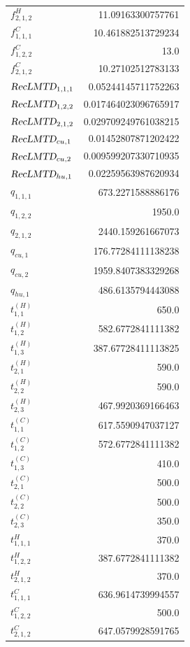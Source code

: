 \documentclass{article}%
\begin{document}
\begin{multicols*}{3}
\begin{supertabular}{lr}
	$f_{2,1,2}^{H}$ & 11.09163300757761 \\%
	$f_{1,1,1}^{C}$ & 10.461882513729234 \\%
	$f_{1,2,2}^{C}$ & 13.0 \\%
	$f_{2,1,2}^{C}$ & 10.27102512783133 \\%
	$\textsl{RecLMTD}_{1,1,1}$ & 0.05244145711752263 \\%
	$\textsl{RecLMTD}_{1,2,2}$ & 0.017464023096765917 \\%
	$\textsl{RecLMTD}_{2,1,2}$ & 0.029709249761038215 \\%
	$\textsl{RecLMTD}_{cu,1}$ & 0.01452807871202422 \\%
	$\textsl{RecLMTD}_{cu,2}$ & 0.009599207330710935 \\%
	$\textsl{RecLMTD}_{hu,1}$ & 0.02259563987620934 \\%
	$q_{1,1,1}$ & 673.2271588886176 \\%
	$q_{1,2,2}$ & 1950.0 \\%
	$q_{2,1,2}$ & 2440.159261667073 \\%
	$q_{cu,1}$ & 176.77284111138238 \\%
	$q_{cu,2}$ & 1959.8407383329268 \\%
	$q_{hu,1}$ & 486.6135794443088 \\%
	$t_{1,1}^{(H)}$ & 650.0 \\%
	$t_{1,2}^{(H)}$ & 582.6772841111382 \\%
	$t_{1,3}^{(H)}$ & 387.67728411113825 \\%
	$t_{2,1}^{(H)}$ & 590.0 \\%
	$t_{2,2}^{(H)}$ & 590.0 \\%
	$t_{2,3}^{(H)}$ & 467.9920369166463 \\%
	$t_{1,1}^{(C)}$ & 617.5590947037127 \\%
	$t_{1,2}^{(C)}$ & 572.6772841111382 \\%
	$t_{1,3}^{(C)}$ & 410.0 \\%
	$t_{2,1}^{(C)}$ & 500.0 \\%
	$t_{2,2}^{(C)}$ & 500.0 \\%
	$t_{2,3}^{(C)}$ & 350.0 \\%
	$t_{1,1,1}^{H}$ & 370.0 \\%
	$t_{1,2,2}^{H}$ & 387.6772841111382 \\%
	$t_{2,1,2}^{H}$ & 370.0 \\%
	$t_{1,1,1}^{C}$ & 636.9614739994557 \\%
	$t_{1,2,2}^{C}$ & 500.0 \\%
	$t_{2,1,2}^{C}$ & 647.0579928591765 \\%

\end{supertabular}
\end{multicols*}
\end{document}
